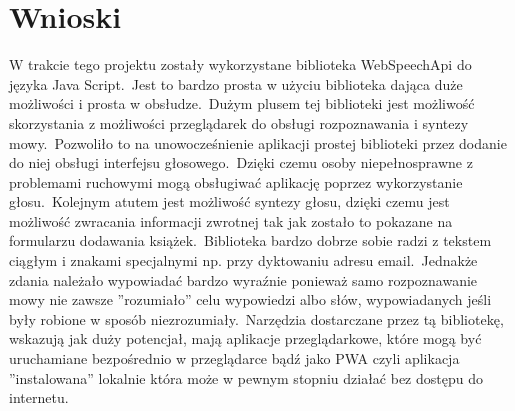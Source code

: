 \chapter{Wnioski}
W trakcie tego projektu zostały wykorzystane biblioteka WebSpeechApi do języka Java Script.\ Jest to bardzo prosta w użyciu biblioteka dająca duże możliwości i prosta w obsłudze.\ Dużym plusem tej biblioteki jest możliwość skorzystania z możliwości przeglądarek do obsługi rozpoznawania i syntezy mowy.\ Pozwoliło to na unowocześnienie aplikacji prostej biblioteki przez dodanie do niej obsługi interfejsu głosowego.\ Dzięki czemu osoby niepełnosprawne z problemami ruchowymi mogą obsługiwać aplikację poprzez wykorzystanie głosu.\ Kolejnym atutem jest możliwość syntezy głosu, dzięki czemu jest możliwość zwracania informacji zwrotnej tak jak zostało to pokazane na formularzu dodawania książek.\ Biblioteka bardzo dobrze sobie radzi z tekstem ciągłym i znakami specjalnymi np. przy dyktowaniu adresu email.\ Jednakże zdania należało wypowiadać bardzo wyraźnie ponieważ samo rozpoznawanie mowy nie zawsze ''rozumiało'' celu wypowiedzi albo słów, wypowiadanych jeśli były robione w sposób niezrozumiały.\ Narzędzia dostarczane przez tą bibliotekę, wskazują jak duży potencjał, mają aplikacje przeglądarkowe, które mogą być uruchamiane bezpośrednio w przeglądarce bądź jako PWA  czyli aplikacja ''instalowana'' lokalnie która może w pewnym stopniu działać bez dostępu do internetu.
